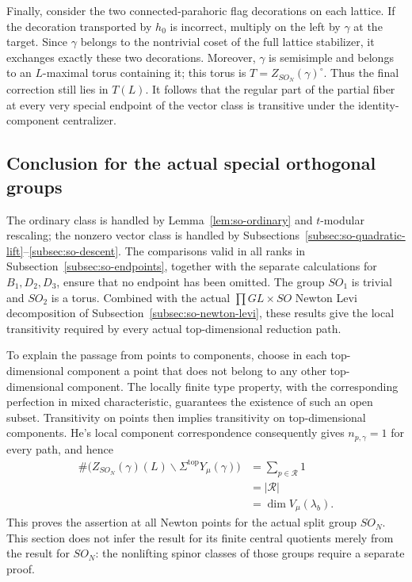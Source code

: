 \documentclass[11pt,a4paper]{article}
\theoremstyle{definition}
\theoremstyle{remark}
\begin{document}
Finally, consider the two connected-parahoric flag
decorations on each lattice. If the decoration transported
by \(h_0\) is incorrect, multiply on the left by \(\gamma\)
at the target. Since \(\gamma\) belongs to the nontrivial
coset of the full lattice stabilizer, it exchanges exactly
these two decorations. Moreover, \(\gamma\) is semisimple
and belongs to an \(L\)-maximal torus containing it; this
torus is \(T=Z_{SO_N}(\gamma)^\circ\). Thus the final
correction still lies in \(T(L)\). It follows that the
regular part of the partial fiber at every very special
endpoint of the vector class is transitive under the
identity-component centralizer.

\subsection{Conclusion for the actual special orthogonal groups}
\label{subsec:so-conclusion}

The ordinary class is handled by
Lemma~\ref{lem:so-ordinary} and \(t\)-modular rescaling;
the nonzero vector class is handled by
Subsections~\ref{subsec:so-quadratic-lift}--\ref{subsec:so-descent}.
The comparisons valid in all ranks in
Subsection~\ref{subsec:so-endpoints}, together with the
separate calculations for \(B_1,D_2,D_3\), ensure that no
endpoint has been omitted. The group \(SO_1\) is trivial
and \(SO_2\) is a torus. Combined with the actual
\(\prod GL\times SO\) Newton Levi decomposition of
Subsection~\ref{subsec:so-newton-levi}, these results give
the local transitivity required by every actual
top-dimensional reduction path.

To explain the passage from points to components, choose
in each top-dimensional component a point that does not
belong to any other top-dimensional component. The
locally finite type property, with the corresponding
perfection in mixed characteristic, guarantees the
existence of such an open subset. Transitivity on points
then implies transitivity on top-dimensional components.
He's local component correspondence consequently gives
\(n_{p,\gamma}=1\) for every path, and hence
\[
\begin{aligned}
 \#\bigl(Z_{SO_N}(\gamma)(L)\backslash
              \Sigma^{\mathrm{top}}Y_\mu(\gamma)\bigr)
 &=\sum_{p\in\mathcal R}1\\
 &=|\mathcal R|\\
 &=\dim V_\mu(\lambda_b).
\end{aligned}
\]
This proves the assertion at all Newton points for the
actual split group \(SO_N\). This section does not infer
the result for its finite central quotients merely from
the result for \(SO_N\): the nonlifting spinor classes of
those groups require a separate proof.
\end{document}
